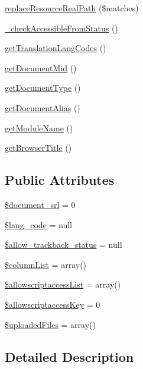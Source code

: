 \begin{DoxyCompactItemize}
\hyperlink{classdocumentItem_a47d377b1f8ae94615b363f4f00bc94fc}{replace\+Resource\+Real\+Path} (\$matches)
\item 
\hyperlink{classdocumentItem_a16bc4bb18f4e29b0244e647eb89e2f45}{\+\_\+check\+Accessible\+From\+Status} ()
\item 
\hyperlink{classdocumentItem_afd284f32681755444c28e93c14f55c28}{get\+Translation\+Lang\+Codes} ()
\item 
\hyperlink{classdocumentItem_ae8d90b15c65199e9acb4622b3da43119}{get\+Document\+Mid} ()
\item 
\hyperlink{classdocumentItem_a393ee98eeada92d1bd3b41f5018f746e}{get\+Document\+Type} ()
\item 
\hyperlink{classdocumentItem_adad3fafeaac19dfed4bea9e5709677d4}{get\+Document\+Alias} ()
\item 
\hyperlink{classdocumentItem_abc1a8bc25ecdbf936fba6e62b773b01c}{get\+Module\+Name} ()
\item 
\hyperlink{classdocumentItem_a386ced6121facbf9f54c2675afb8a037}{get\+Browser\+Title} ()
\end{DoxyCompactItemize}
\subsection*{Public Attributes}
\begin{DoxyCompactItemize}
\item 
\hyperlink{classdocumentItem_a87159d1cf24944d081646e6fe4f7e0f6}{\$document\+\_\+srl} = 0
\item 
\hyperlink{classdocumentItem_a5fa7aa5d52f248116250e95126e8ab87}{\$lang\+\_\+code} = null
\item 
\hyperlink{classdocumentItem_aaf08d80bedc01fc0fc0370677a4ba9cc}{\$allow\+\_\+trackback\+\_\+status} = null
\item 
\hyperlink{classdocumentItem_a244e1382304e15c5ae29e3311ef8e865}{\$column\+List} = array()
\item 
\hyperlink{classdocumentItem_a3b10cc840f3a20580d3ab2269ef24df3}{\$allowscriptaccess\+List} = array()
\item 
\hyperlink{classdocumentItem_ab4273ebe05df985235bf651d918bd4f8}{\$allowscriptaccess\+Key} = 0
\item 
\hyperlink{classdocumentItem_a70d4321ea0edfb6c1fb0775ced8a6b41}{\$uploaded\+Files} = array()
\end{DoxyCompactItemize}


\subsection{Detailed Description}


